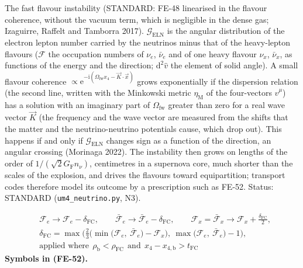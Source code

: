 \documentclass[
  10pt,
]{article}
\begin{document}
The fast flavour instability (STANDARD: FE-48 linearised in the flavour
coherence, without the vacuum term, which is negligible in the dense
gas; Izaguirre, Raffelt and Tamborra 2017).
\(\mathcal{G}_{\mathrm{ELN}}\) is the angular distribution of the
electron lepton number carried by the neutrinos minus that of the
heavy-lepton flavours (\(\mathcal{F}\) the occupation numbers of
\(\nu_e\), \(\bar\nu_e\) and of one heavy flavour \(\nu_x\),
\(\bar\nu_x\), as functions of the energy and the direction;
\(\mathrm{d}^2\hat v\) the element of solid angle). A small flavour
coherence
\(\propto \mathrm{e}^{-\mathrm{i}(\Omega_{\mathrm{fw}}x_4 - \vec K\cdot\vec x)}\)
grows exponentially if the dispersion relation (the second line, written
with the Minkowski metric \(\eta_{\mathrm{M}}\) of the four-vectors
\(\hat v^\mu\)) has a solution with an imaginary part of
\(\Omega_{\mathrm{fw}}\) greater than zero for a real wave vector
\(\vec K\) (the frequency and the wave vector are measured from the
shifts that the matter and the neutrino-neutrino potentials cause, which
drop out). This happens if and only if \(\mathcal{G}_{\mathrm{ELN}}\)
changes sign as a function of the direction, an angular crossing
(Morinaga 2022). The instability then grows on lengths of the order of
\(1/(\sqrt2G_{\mathrm{F}}n_\nu)\), centimetres in a supernova core, much
shorter than the scales of the explosion, and drives the flavours toward
equipartition; transport codes therefore model its outcome by a
prescription such as FE-52. Status: STANDARD (\texttt{um4\_neutrino.py},
N3).

\[
\begin{aligned}
&\mathcal{F}_{e} \to \mathcal{F}_{e} - \delta_{\mathrm{FC}},\qquad \bar{\mathcal{F}}_{e} \to \bar{\mathcal{F}}_{e} - \delta_{\mathrm{FC}},\qquad
 \mathcal{F}_{x} = \bar{\mathcal{F}}_{x} \to \mathcal{F}_{x} + \frac{\delta_{\mathrm{FC}}}{2},\\
&\delta_{\mathrm{FC}} = \max\Big(\frac23\Big(\min\big(\mathcal{F}_{e},\ \bar{\mathcal{F}}_{e}\big) - \mathcal{F}_{x}\Big),\ \max\big(\mathcal{F}_{e},\ \bar{\mathcal{F}}_{e}\big) - 1\Big),\\
&\text{applied where}\ \ \rho_{\mathrm{b}} < \rho_{\mathrm{FC}}\ \ \text{and}\ \ x_4 - x_{4,\mathrm{b}} > t_{\mathrm{FC}}
\end{aligned} \tag{FE-52}
\] \textbf{Symbols in (FE-52).}
\end{document}
